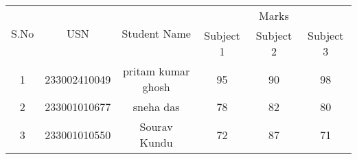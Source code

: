\documentclass{article}
\begin{document}
\begin{table}[h!]
\centering
\begin{tabular}{|c|c|c|c|c|c|}
\hline
\multirow{2}{}{S.No} & \multirow{2}{}{USN} & \multirow{2}{*}{Student Name} & \multicolumn{3}{c|}{Marks} \\ \cline{4-6} 
                      &                      &                               & Subject 1 & Subject 2 & Subject 3 \\ \hline
1                     & 233002410049                &              pritam kumar ghosh         & 95        & 90        & 98        \\ \hline
2                     & 233001010677               & sneha das                    & 78        & 82        & 80        \\ \hline
3                     & 233001010550              & Sourav Kundu                 & 72        & 87        & 71        \\ \hline
\end{tabular}
\label{tab:student_marks}
\end{table}
\end{document}
